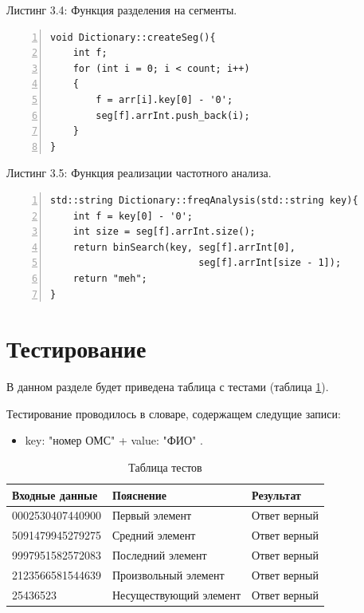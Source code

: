 \documentclass[12pt,a4paper]{report}
\begin{document}
\noindent\textrm{Листинг 3.4: Функция разделения на сегменты.}
\begin{lstlisting}[frame=single, numbers=left]
void Dictionary::createSeg(){
    int f;
    for (int i = 0; i < count; i++)
    {
        f = arr[i].key[0] - '0';
        seg[f].arrInt.push_back(i);
    }
}
\end{lstlisting}


\noindent\textrm{Листинг 3.5: Функция реализации частотного анализа.}
\begin{lstlisting}[frame=single, numbers=left]
std::string Dictionary::freqAnalysis(std::string key){
    int f = key[0] - '0';
    int size = seg[f].arrInt.size();
    return binSearch(key, seg[f].arrInt[0],
                          seg[f].arrInt[size - 1]);
    return "meh";
}
\end{lstlisting}

\section{Тестирование}

В данном разделе будет приведена таблица с тестами (таблица \ref{table:ref1}).

Тестирование проводилось в словаре, содержащем следущие записи:
\begin{itemize}
	\item key: "номер ОМС"  +  value: "ФИО" .
\end{itemize}	

\begin{table}[ht]
	\centering
	\caption{Таблица тестов}
	\label{table:ref1}
	\begin{tabular}{ | l | l | l |}
		\hline
		Входные данные                        & Пояснение              & Результат    \\ \hline
		0002530407440900 & Первый элемент         & Ответ верный \\ \hline
		5091479945279275              & Средний элемент        & Ответ верный \\ \hline
		9997951582572083                             & Последний элемент      & Ответ верный \\ \hline
		2123566581544639                                & Произвольный элемент   & Ответ верный \\ \hline
		25436523                           & Несуществующий элемент & Ответ верный \\ \hline
		\hline
	\end{tabular}
\end{table}
\end{document}
